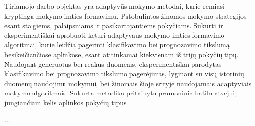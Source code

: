 Tiriamojo darbo objektas yra adaptyv\={u}s mokymo metodai, kurie remiasi kryptingu mokymo imties formavimu. 
Patobulintos \v{z}inomos mokymo strategijos esant staigiems, palaipsniams ir pasikartojantiems poky\v{c}iams. 
Sukurti ir eksperimenti\v{s}kai aprobuoti keturi adaptyvaus mokymo imties formavimo algoritmai, kurie leid\v{z}ia pagerinti klasifikavimo bei prognozavimo tikslum\k{a} besikei\v{c}ian\v{c}iose aplinkose, esant atitinkamai kiekvienam i\v{s} trij\k{u} poky\v{c}i\k{u} tip\k{u}. 
Naudojant generuotus bei realius duomenis, eksperimenti\v{s}kai parodytas klasifikavimo bei prognozavimo tikslumo pager\.ejimas, lyginant su vis\k{u} istorini\k{u} duomen\k{u} naudojimu mokymui, bei \v{z}inomais \v{s}ioje srityje naudojamais adaptyviais mokymo algoritmais. 
Sukurta metodika pritaikyta pramoninio katilo atvejui, jungian\v{c}iam kelis aplinkos poky\v{c}i\k{u} tipus. 

...